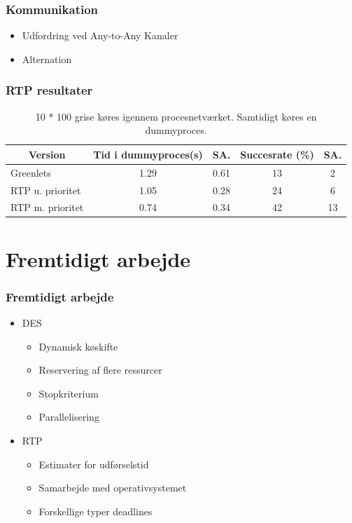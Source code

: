 \documentclass[12pt]{beamer}
\newcommand\mc[1]{\multicolumn{1}{c}{\textbf {#1}}} %
\begin{document}
\begin{frame}
	\frametitle{Kommunikation}
	\begin{itemize}
		\item Udfordring ved Any-to-Any Kanaler 
	 	\item Alternation
	\end{itemize} 
\end{frame} 

\begin{frame}
  	\frametitle{RTP resultater}
	\tiny 
	\begin{table}[htbp]
		\centering
		\begin{tabular}{lcccc}
		   	\toprule
		    \mc{Version}&\mc{Tid i dummyproces(s)}&\mc{SA.}& \mc{Succesrate (\%)}&\mc{SA.}\\
		    \midrule
		    Greenlets         & 1.29 & 0.61 & 13 & 2  \\
		    RTP u. prioritet  & 1.05 & 0.28 & 24 & 6  \\
		    RTP m. prioritet  & 0.74 & 0.34 & 42 & 13 \\
		    \bottomrule
		\end{tabular}
		\caption[]{\tiny 10 * 100 grise køres igennem procesnetværket. Samtidigt køres en dummyproces.}
	\end{table}
\end{frame} 

\section{Fremtidigt arbejde}
\begin{frame}
  	\frametitle{Fremtidigt arbejde}
\begin{itemize}
\item DES
	\begin{itemize}
	\item Dynamisk køskifte
	\item Reservering af flere ressurcer
	\item Stopkriterium
	\item Parallelisering
	\end{itemize}
\item RTP
	\begin{itemize}
	\item Estimater for udførselstid
	\item Samarbejde med operativsystemet
	\item Forskellige typer deadlines
	\end{itemize}
\end{itemize}
\end{frame}
 
\end{document}
